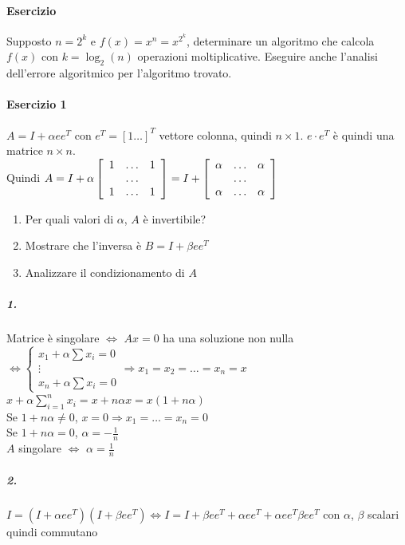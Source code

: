 \documentclass[10pt]{book}
\begin{document}
\paragraph{Esercizio} Supposto $n = 2^k$ e $f(x) = x^n = x^{2^k}$, determinare un algoritmo che calcola $f(x)$ con $k = \log_2(n)$ operazioni moltiplicative. Eseguire anche l'analisi dell'errore algoritmico per l'algoritmo trovato.
\pagebreak
\paragraph{Esercizio 1}
$A = I + \alpha e e^T$ con $e^T = [1\ldots ]^T$ vettore colonna, quindi $n \times 1$. $e\cdot e^T$ è quindi una matrice $n \times n$.\\
Quindi $A = I + \alpha\left[
\begin{array}{c c c}
	1 & \ldots & 1\\
	 & \ldots\\
	1 & \ldots & 1
\end{array}
\right]
= I + \left[
\begin{array}{c c c}
	\alpha & \ldots & \alpha\\
	 & \ldots\\
	\alpha & \ldots & \alpha
\end{array}
\right]
$
\begin{enumerate}
	\item Per quali valori di $\alpha$, $A$ è invertibile?
	\item Mostrare che l'inversa è $B = I + \beta e e^T$
	\item Analizzare il condizionamento di $A$
\end{enumerate}
\subparagraph{1.} Matrice è singolare $\Leftrightarrow$ $Ax = 0$ ha una soluzione non nulla $\Leftrightarrow \left\{ \begin{array}{l }
	x_1 + \alpha \sum x_i = 0\\
	\vdots\\
	x_n + \alpha \sum x_i = 0
\end{array}
\right.
\Rightarrow x_1 = x_2 = \ldots = x_n = x
$\\
$x + \alpha \sum _{i = 1}^n x_i = x + n \alpha x = x (1 + n\alpha)$\\
Se $1 + n\alpha \neq 0$, $x = 0 \Rightarrow x_1 = \ldots = x_n = 0$\\
Se $1 + n\alpha = 0$, $\alpha = -\frac{1}{n}$\\
$A$ singolare $\Leftrightarrow$ $\alpha = \frac{1}{n}$
\subparagraph{2.} $I = (I + \alpha e e^T)(I + \beta e e^T) \Leftrightarrow I = I + \beta e e^T + \alpha e e^T + \alpha e e^T \beta e e^T$ con $\alpha$, $\beta$ scalari quindi commutano\\
\end{document}
